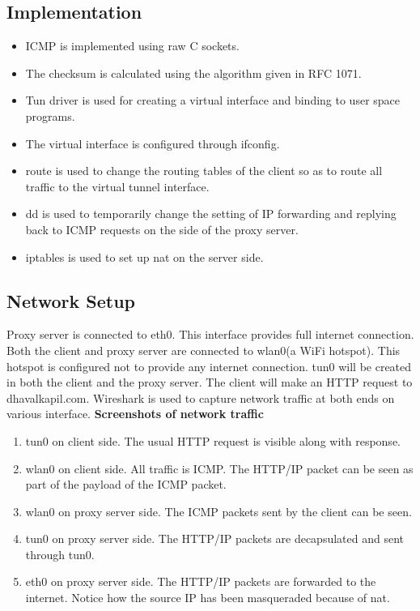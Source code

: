 \subsection*{Implementation}
\begin{itemize}
    \item ICMP is implemented using raw C sockets.
    \item The checksum is calculated using the algorithm given in RFC 1071. 
    \item Tun driver is used for creating a virtual interface and binding to user space programs. 
    \item The virtual interface is configured through ifconfig.
    \item route is used to change the routing tables of the client so as to route all traffic to the virtual tunnel interface.
    \item dd is used to temporarily change the setting of IP forwarding and replying back to ICMP requests on the side of the proxy server.
    \item iptables is used to set up nat on the server side.
\end{itemize} 



\subsection*{Network Setup}
Proxy server is connected to eth0. 
This interface provides full internet connection.
Both the client and proxy server are connected to wlan0(a WiFi hotspot). 
This hotspot is configured not to provide any internet connection.
tun0 will be created in both the client and the proxy server.
The client will make an HTTP request to dhavalkapil.com.
Wireshark is used to capture network traffic at both ends on various interface.
\vspace{1ex} \newline
\textbf{Screenshots of network traffic}
\begin{enumerate}
    \item tun0 on client side. The usual HTTP request is visible along with response.
    \item wlan0 on client side. All traffic is ICMP. The HTTP/IP packet can be seen as part of the payload of the ICMP packet.
    \item wlan0 on proxy server side. The ICMP packets sent by the client can be seen.
    \item tun0 on proxy server side. The HTTP/IP packets are decapsulated and sent through tun0.
    \item eth0 on proxy server side. The HTTP/IP packets are forwarded to the internet. Notice how the source IP has been masqueraded because of nat.
\end{enumerate} 





